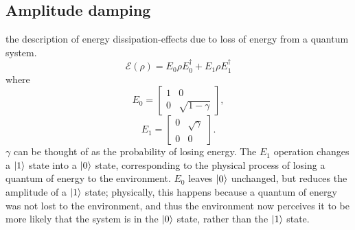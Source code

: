 \documentclass[11pt, oneside]{article}   	%
\begin{document}
\subsection{Amplitude damping}
the description of energy dissipation-effects due to loss of energy from a quantum system.
\begin{equation}
\mathcal{E} (\rho) = E_0 \rho E^{\dagger}_0 + E_1 \rho E^{\dagger}_1
\end{equation}
where 
\begin{equation}
E_0 = 
\begin{bmatrix}
1 & 0 \\
0 & \sqrt{1 - \gamma}
\end{bmatrix}, 
\end{equation}
\begin{equation}
E_1 = 
\begin{bmatrix}
0 & \sqrt{\gamma} \\
0 & 0
\end{bmatrix}.
\end{equation}
$\gamma$ can be thought of as the probability of losing energy.
The $E_1$ operation changes a $\ket{1}$ state into a $\ket{0}$ state, corresponding to the physical process of losing a quantum of energy to the environment. 
$E_0$ leaves $\ket{0}$ unchanged, but reduces the amplitude of a $\ket{1}$ state; 
physically, this happens because a quantum of energy was not lost to the environment, and thus the environment now perceives it to be more likely that the system is in the $\ket{0}$  state, rather than the $\ket{1}$ state.
\end{document}
